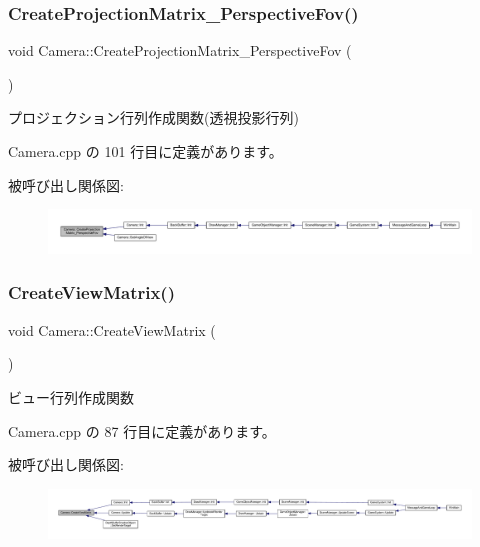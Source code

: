 \subsubsection{\texorpdfstring{Create\+Projection\+Matrix\+\_\+\+Perspective\+Fov()}{CreateProjectionMatrix\_PerspectiveFov()}}
{\footnotesize\ttfamily void Camera\+::\+Create\+Projection\+Matrix\+\_\+\+Perspective\+Fov (\begin{DoxyParamCaption}{ }\end{DoxyParamCaption})}



プロジェクション行列作成関数(透視投影行列) 



 Camera.\+cpp の 101 行目に定義があります。

被呼び出し関係図\+:
\nopagebreak
\begin{figure}[H]
\begin{center}
\leavevmode
\includegraphics[width=350pt]{class_camera_a1786fe1adbe95e2ffa2de4cdb114546a_icgraph}
\end{center}
\end{figure}
\mbox{\label{class_camera_a5b4993ffb218536cb31d6d5224453b1a}} 
\subsubsection{\texorpdfstring{Create\+View\+Matrix()}{CreateViewMatrix()}}
{\footnotesize\ttfamily void Camera\+::\+Create\+View\+Matrix (\begin{DoxyParamCaption}{ }\end{DoxyParamCaption})}



ビュー行列作成関数 



 Camera.\+cpp の 87 行目に定義があります。

被呼び出し関係図\+:
\nopagebreak
\begin{figure}[H]
\begin{center}
\leavevmode
\includegraphics[width=350pt]{class_camera_a5b4993ffb218536cb31d6d5224453b1a_icgraph}
\end{center}
\end{figure}
\mbox{\label{class_camera_a9d54f574c141e6007d98ccd905501632}} 

